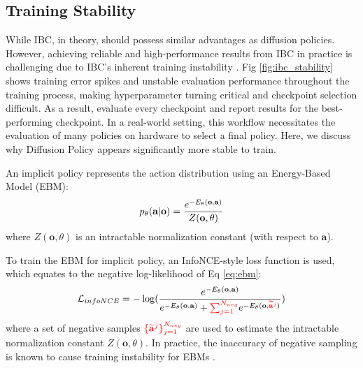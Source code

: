 \documentclass[Afour,sageh,times]{sagej}
\begin{document}
\subsection{Training Stability}
\label{sec:ibc_stability}

While IBC, in theory, should possess similar advantages as diffusion policies. However, achieving reliable and high-performance results from IBC in practice is challenging due to IBC's inherent training instability \cite{ta2022conditional}. Fig \ref{fig:ibc_stability} shows training error spikes and unstable evaluation performance throughout the training process, making hyperparameter turning critical and checkpoint selection difficult. As a result, \citet{ibc} evaluate every checkpoint and report results for the best-performing checkpoint. In a real-world setting, this workflow necessitates the evaluation of many policies on hardware to select a final policy. Here, we discuss why Diffusion Policy appears significantly more stable to train.


An implicit policy represents the action distribution using an Energy-Based Model (EBM):
\vspace{-2mm}
\begin{equation}
    \label{eq:ebm}
    p_\theta(\mathbf{a}|\mathbf{o})=\frac{e^{-E_\theta(\mathbf{o},\mathbf{a})}}{Z(\mathbf{o},\theta)}
\vspace{-1mm}
\end{equation}
where $Z(\mathbf{o},\theta)$ is an intractable normalization constant (with respect to $\mathbf{a}$).

To train the EBM for implicit policy, an InfoNCE-style loss function is used, which equates to the negative log-likelihood of Eq \ref{eq:ebm}:
\begin{equation}
    \label{eq:infonce}
    \mathcal{L}_{infoNCE}=-\log(\frac{
        e^{-E_\theta(\mathbf{o},\mathbf{a})}
    }{
        e^{-E_\theta(\mathbf{o},\mathbf{a})} +
            \textcolor{red}{\sum^{N_{neg}}_{j=1}}e^{
                -E_\theta(\mathbf{o},\textcolor{red}{\widetilde{\mathbf{a}}^j})}
    })
\end{equation}
where a set of negative samples $\textcolor{red}{\{\widetilde{\mathbf{a}}^j\}^{N_{neg}}_{j=1}}$ are used to estimate the intractable normalization constant $Z(\mathbf{o},\theta)$. In practice, the inaccuracy of negative sampling is known to cause training instability for EBMs \cite{du2020improved,ta2022conditional}.
\end{document}
